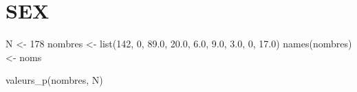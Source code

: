 \documentclass[
]{article}
\newenvironment{Shaded}{\begin{snugshade}}{\end{snugshade}}
\newcommand{\DecValTok}[1]{\textcolor[rgb]{0.00,0.00,0.81}{#1}}
\newcommand{\FloatTok}[1]{\textcolor[rgb]{0.00,0.00,0.81}{#1}}
\newcommand{\FunctionTok}[1]{\textcolor[rgb]{0.00,0.00,0.00}{#1}}
\newcommand{\NormalTok}[1]{#1}
\newcommand{\OtherTok}[1]{\textcolor[rgb]{0.56,0.35,0.01}{#1}}
\begin{document}
\hypertarget{sex}{%
\section{SEX}\label{sex}}

\begin{Shaded}
\begin{Highlighting}[]
\NormalTok{N }\OtherTok{\textless{}{-}} \DecValTok{178}
\NormalTok{nombres }\OtherTok{\textless{}{-}} \FunctionTok{list}\NormalTok{(}\DecValTok{142}\NormalTok{, }\DecValTok{0}\NormalTok{, }\FloatTok{89.0}\NormalTok{,   }\FloatTok{20.0}\NormalTok{, }\FloatTok{6.0}\NormalTok{, }\FloatTok{9.0}\NormalTok{,   }\FloatTok{3.0}\NormalTok{, }\DecValTok{0}\NormalTok{, }\FloatTok{17.0}\NormalTok{)}
\FunctionTok{names}\NormalTok{(nombres) }\OtherTok{\textless{}{-}}\NormalTok{ noms}

\FunctionTok{valeurs\_p}\NormalTok{(nombres, N)}
\end{Highlighting}
\end{Shaded}
\end{document}
